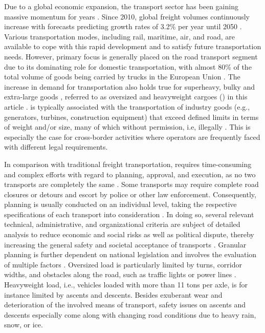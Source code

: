 
Due to a global economic expansion, the transport sector has been gaining massive momentum for years \cite{gungor2018detect}.
Since 2010, global freight volumes continuously increase with forecasts predicting growth rates of 3.2\% per year until 2050 \cite{figura2020preferences, InternationalTransportForum}.
Various transportation modes, including rail, maritime, air, and road, are available to cope with this rapid development and to satisfy future transportation needs.
However, primary focus is generally placed on the road transport segment due to its dominating role for domestic transportation, with almost 80\% of the total volume of goods being carried by trucks in the European Union \cite{Eurostat}.
The increase in demand for transportation also holds true for superheavy, bulky and extra-large goods \cite{gavrilova2021analysis}, referred to as oversized and heavyweight cargoes (\ohc) in this article \cite{Luo.2021}.
\ohc is typically associated with the transportation of industry goods (e.g., generators, turbines, construction equipment) that exceed defined limits in terms of weight and/or size, many of which without permission, i.e, illegally \cite{fiorillo2016minimizing}. This is especially the case for cross-border activities where operators are frequently faced with different legal requirements.
\par In comparison with traditional freight transportation, \ohc requires time-consuming and complex efforts with regard to planning, approval, and execution, as no two \ohc transports are completely the same \cite{Wolnowska.2019}.
Some \ohc transports may require complete road closures or detours and escort by police or other law enforcement.
Consequently, planning is usually conducted on an individual level, taking the respective specifications of each \ohc transport into consideration \cite{Bazaras.2013}.
In doing so, several relevant technical, administrative, and organizational criteria are subject of detailed analysis to reduce economic and social risks as well as political dispute, thereby increasing the general safety and societal acceptance of \ohc transports \cite{Palsaitis.2012}.
Granular planning is further dependent on national legislation and involves the evaluation of multiple factors \cite{zhu2014vehicle}. Oversized load is particularly limited by turns, corridor widths, and obstacles along the road, such as traffic lights or power lines \cite{PETRASKA.2018, arentze2012context}. Heavyweight load, i.e., vehicles loaded with more than 11 tons per axle, is for instance limited by ascents and descents. Besides exuberant wear and deterioration of the involved means of transport, safety issues on ascents and descents especially come along with changing road conditions due to heavy rain, snow, or ice.
